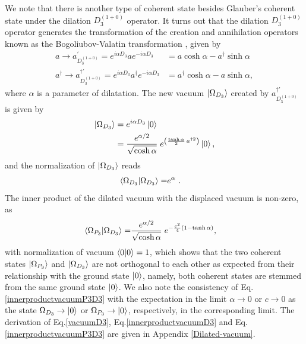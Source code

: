 \documentclass[%
 reprint,
superscriptaddress,
 amsmath,amssymb,
 aps,
]{revtex4-2}
\begin{document}
We note that there is another type of coherent state besides Glauber's coherent state under the dilation $D^{(1+0)}_{3}$ operator.
It turns out that the dilation $D^{(1+0)}_{3}$ operator generates  the transformation of the creation and annihilation operators known as the  Bogoliubov-Valatin transformation \cite{umezawa1982thermo}, given by
\begin{align}
    a \rightarrow a^{\prime}_{D^{(1+0)}_{3}}=e^{i\alpha D_{3}}ae^{-i\alpha D_{3}}&=a\cosh{\alpha}-a^{\dagger}\sinh{\alpha}\label{aD1+0}\\
    a^{\dagger} \rightarrow a^{\dagger\prime}_{D^{(1+0)}_{3}}=e^{i\alpha D_{3}}a^{\dagger}e^{-i\alpha D_{3}}&=a^{\dagger}\cosh{\alpha}-a\sinh{\alpha},\label{adaggerD1+0}
\end{align}
where $\alpha$ is a parameter of dilatation. The new vacuum $\ket{\Omega_{D_{3}}}$ created by $a^{\dagger\prime}_{D^{(1+0)}_{3}}$ is given by
\begin{align}
    \ket{\Omega_{D_{3}}}&=e^{i\alpha D_{3}}\ket{0}\\
    &=\frac{e^{\alpha/2}}{\sqrt{\cosh\alpha}}\;
     e^{\left(\frac{\tanh\alpha}{2}\,a^{\dagger2}\right)}\ket{0},\label{vacuumD3}
\end{align}
and the normalization of $\ket{\Omega_{D_{3}}}$ reads
\begin{align}
    \braket{\Omega_{D_{3}}|\Omega_{D_{3}}}=&e^{\alpha}~.\label{innerproductvacuumD3}
\end{align}
The inner product of the dilated vacuum with the displaced vacuum is non-zero, as
\begin{align}   \braket{\Omega_{P_{3}}|\Omega_{D_{3}}} =&  \frac{e^{\alpha/2}}{\sqrt{\cosh\alpha}}\; e^{-\frac{c^2}{4}(1-\tanh\alpha)},\label{innerproductvacuumP3D3}
\end{align}
with normalization of vacuum $\braket{0|0}=1$, 
which shows that the two coherent states $\ket{\Omega_{P_{3}}}$ and $\ket{\Omega_{D_{3}}}$ are not orthogonal to each other as expected from their relationship with the ground state $\ket{0}$, namely, both coherent states are stemmed from the same ground state $\ket{0}$. We also note the consistency of Eq.\eqref{innerproductvacuumP3D3} with the expectation in the limit $\alpha \to 0$ or $c \to 0$ as  the state $\Omega_{D_3} \to \ket{0}$ or $\Omega_{P_3} \to \ket{0}$, respectively, in the corresponding limit. The derivation of Eq.\eqref{vacuumD3}, Eq.\eqref{innerproductvacuumD3} and Eq.\eqref{innerproductvacuumP3D3} are given in Appendix \ref{Dilated-vacuum}.
\end{document}
